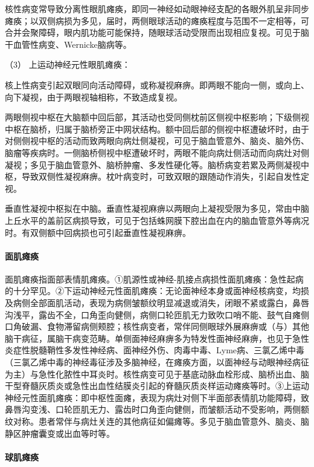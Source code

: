 核性病变常导致分离性眼肌瘫痪，即同一神经如动眼神经支配的各眼外肌呈非同步瘫痪；以双侧病损为多见，届时，两侧眼球活动的瘫痪程度与范围不一定相等，可合并会聚障碍，眼内肌功能可能保持，随眼球活动受限而出现相应复视。可见于脑干血管性病变、Wernicke脑病等。

\hypertarget{text00018.htmlux5cux23CHP1-6-2-3-1-3}{}
（3） 上运动神经元性眼肌瘫痪：

核上性病变引起双眼同向活动障碍，或称凝视麻痹。即两眼不能向一侧，或向上、向下凝视，由于两眼视轴相称，不致造成复视。

两眼侧视中枢在大脑额中回后部，其活动也受同侧枕前区侧视中枢影响；下级侧视中枢在脑桥，归属于脑桥旁正中网状结构。额中回后部的侧视中枢遭破坏时，由于对侧侧视中枢的活动而致两眼向病灶侧凝视，可见于脑血管意外、脑炎、脑外伤、脑瘤等疾病时。一侧脑桥侧视中枢遭破坏时，两眼不能向病灶侧活动而向病灶对侧凝视；多见于脑血管意外、脑桥肿瘤、多发性硬化等。脑桥病变若累及两侧凝视中枢，导致双侧性凝视麻痹。枕叶病变时，可致双眼的跟随动作消失，引起自发性定视。

垂直性凝视中枢拟在中脑。垂直性凝视麻痹以两眼向上凝视受限为多见，常由中脑上丘水平的盖前区病损导致，可见于包括蛛网膜下腔出血在内的脑血管意外等病况时。有双侧额中回病损也可引起垂直性凝视麻痹。

\paragraph{面肌瘫痪}

面肌瘫痪指面部表情肌瘫痪。①肌源性或神经-肌接点病损性面肌瘫痪：急性起病的十分罕见。②下运动神经元性面肌瘫痪：无论面神经本身或面神经核病变，均损及病侧全部面肌活动，表现为病侧皱额纹明显减退或消失，闭眼不紧或露白，鼻唇沟浅平，露齿不全，口角歪向健侧，病侧口轮匝肌无力致吹口哨不能、鼓气自瘫侧口角破漏、食物滞留病侧颊腔；核性病变者，常伴同侧眼球外展麻痹或（与）其他脑干病征，属脑干病变范畴。单侧面神经麻痹多为特发性面神经麻痹，也见于急性炎症性脱髓鞘性多发性神经病、面神经外伤、肉毒中毒、Lyme病、三氯乙烯中毒（三氯乙烯中毒的神经毒征涉及多脑神经，在瘫痪方面，以面神经与动眼神经病征为主）与急性化脓性中耳炎时。核性病变可见于基底动脉血栓形成、脑桥出血、脑干型脊髓灰质炎或急性出血性结膜炎引起的脊髓灰质炎样运动瘫痪等时。③上运动神经元性面肌瘫痪：即中枢性面瘫，表现为病灶对侧下半面部表情肌功能障碍，致鼻唇沟变浅、口轮匝肌无力、露齿时口角歪向健侧，而皱额活动不受影响，两侧额纹对称。患者常伴与病灶关连的其他病征如偏瘫等。多见于脑血管意外、脑炎、脑静区肿瘤囊变或出血等时等。

\paragraph{球肌瘫痪}

